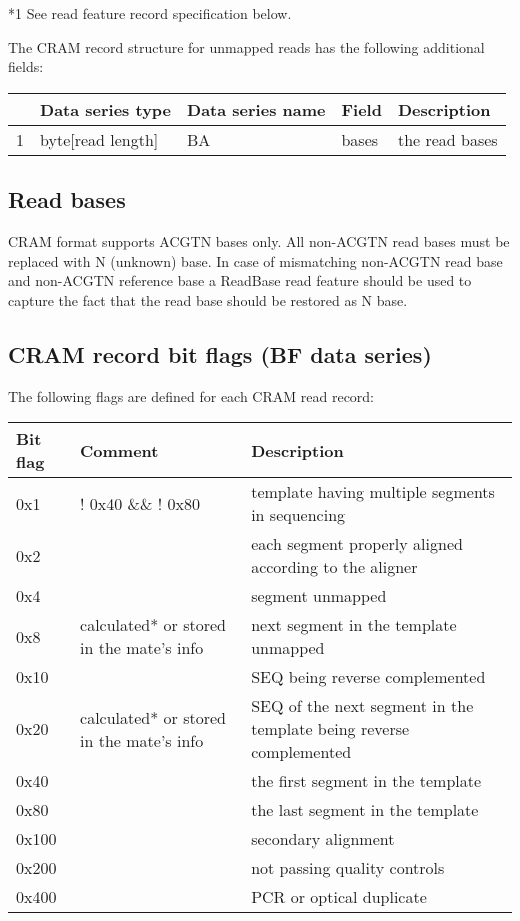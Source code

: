 \documentclass[a4paper]{article}
\begin{document}
*1 See read feature record specification below.

The CRAM record structure for unmapped reads has the following additional fields:

\begin{tabular}{|>{\raggedright}p{8pt}|>{\raggedright}p{88pt}|>{\raggedright}p{83pt}|>{\raggedright}p{85pt}|>{\raggedright}p{178pt}|}
\hline
 & \textbf{Data series type} & \textbf{Data series name} & \textbf{Field} & \textbf{Description}\tabularnewline
\hline
1 & byte[read length] & BA & bases & the read bases\tabularnewline
\hline
\end{tabular}

\subsection{\textbf{Read bases}}

CRAM format supports ACGTN bases only. All non-ACGTN read bases must be replaced 
with N (unknown) base. In case of mismatching non-ACGTN read base and non-ACGTN 
reference base a ReadBase read feature should be used to capture the fact that 
the read base should be restored as N base. 

\subsection{\textbf{CRAM record bit flags (BF data series)}}

The following flags are defined for each CRAM read record:

\begin{tabular}{|>{\raggedright}p{144pt}|>{\raggedright}p{144pt}|>{\raggedright}p{144pt}|}
\hline
\textbf{Bit flag} & \textbf{Comment} & \textbf{Description}\tabularnewline
\hline
0x1 & ! 0x40 \&\& ! 0x80 & template having multiple segments in sequencing\tabularnewline
\hline
0x2 &  & each segment properly aligned according to the aligner\tabularnewline
\hline
0x4 &  & segment unmapped\tabularnewline
\hline
0x8 & calculated* or stored in the mate's info & next segment in the template unmapped\tabularnewline
\hline
0x10 &  & SEQ being reverse complemented\tabularnewline
\hline
0x20 & calculated* or stored in the mate's info & SEQ of the next segment in the 
template being reverse complemented\tabularnewline
\hline
0x40 &  & the first segment in the template\tabularnewline
\hline
0x80 &  & the last segment in the template\tabularnewline
\hline
0x100 &  & secondary alignment\tabularnewline
\hline
0x200 &  & not passing quality controls\tabularnewline
\hline
0x400 &  & PCR or optical duplicate\tabularnewline
\hline
\end{tabular}
\end{document}
